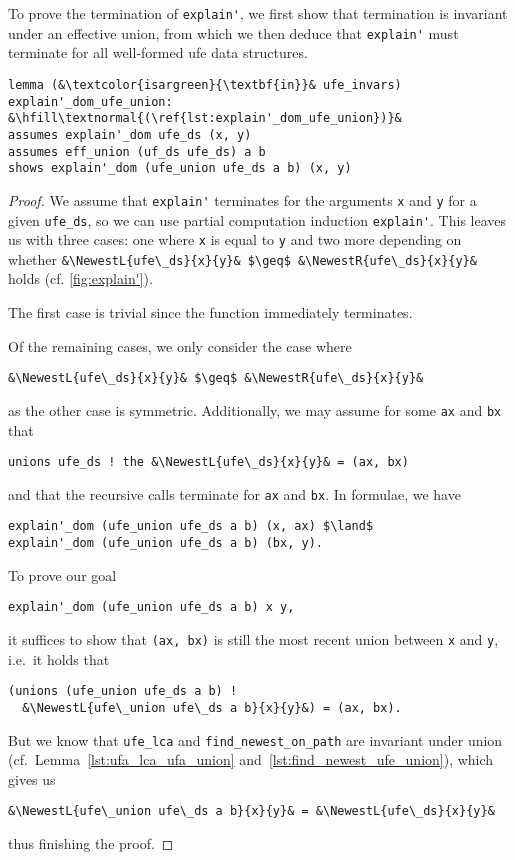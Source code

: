 \documentclass[
  sigplan,
  10pt,
  anonymous,
  review,
  ]{acmart}
\newcommand{\NewestL}[3]{(#2 $\upharpoonleft$ #3)$_\text{#1}$}
\newcommand{\NewestR}[3]{(#2 $\upharpoonright$ #3)$_\text{#1}$}
\begin{document}
To prove the termination of \lstinline|explain'|, we first show that termination is invariant under an effective union, from which we then deduce that \lstinline|explain'| must terminate for all well-formed \acrshort{ufe} data structures.
\begin{lstlisting}[caption={[empty]}, label={lst:explain'_dom_ufe_union}]
lemma (&\textcolor{isargreen}{\textbf{in}}& ufe_invars) explain'_dom_ufe_union: &\hfill\textnormal{(\ref{lst:explain'_dom_ufe_union})}&
assumes explain'_dom ufe_ds (x, y)
assumes eff_union (uf_ds ufe_ds) a b
shows explain'_dom (ufe_union ufe_ds a b) (x, y)
\end{lstlisting}
\begin{proof}
  We assume that \lstinline|explain'| terminates for the arguments \lstinline|x| and \lstinline|y| for a given \lstinline|ufe_ds|, so we can use partial computation induction \lstinline|explain'|.
  This leaves us with three cases: one where \lstinline|x| is equal to \lstinline|y| and two more depending on whether \lstinline|&\NewestL{ufe\_ds}{x}{y}& $\geq$ &\NewestR{ufe\_ds}{x}{y}&| holds (cf. \autoref{fig:explain'}).

  The first case is trivial since the function immediately terminates.

  Of the remaining cases, we only consider the case where
  \begin{lstlisting}
&\NewestL{ufe\_ds}{x}{y}& $\geq$ &\NewestR{ufe\_ds}{x}{y}& 
  \end{lstlisting}
  as the other case is symmetric.
  Additionally, we may assume for some \lstinline|ax| and \lstinline|bx| that
  \begin{lstlisting}
unions ufe_ds ! the &\NewestL{ufe\_ds}{x}{y}& = (ax, bx)
  \end{lstlisting}
  and that the recursive calls terminate for \lstinline|ax| and \lstinline|bx|.
  In formulae, we have
  \begin{lstlisting}
explain'_dom (ufe_union ufe_ds a b) (x, ax) $\land$
explain'_dom (ufe_union ufe_ds a b) (bx, y).
  \end{lstlisting}
  To prove our goal
  \begin{lstlisting}
explain'_dom (ufe_union ufe_ds a b) x y,
  \end{lstlisting}
it suffices to show that \lstinline|(ax, bx)| is still the most recent union between \lstinline|x| and \lstinline|y|, i.e.\ it holds that 
  \begin{lstlisting}
(unions (ufe_union ufe_ds a b) !
  &\NewestL{ufe\_union ufe\_ds a b}{x}{y}&) = (ax, bx).
  \end{lstlisting}
  But we know that \lstinline|ufe_lca| and \lstinline|find_newest_on_path| are invariant under union (cf.\ Lemma~\ref{lst:ufa_lca_ufa_union} and~\ref{lst:find_newest_ufe_union}), which gives us
  \begin{lstlisting}
&\NewestL{ufe\_union ufe\_ds a b}{x}{y}& = &\NewestL{ufe\_ds}{x}{y}&
  \end{lstlisting}
  thus finishing the proof.
\end{proof}
\end{document}
